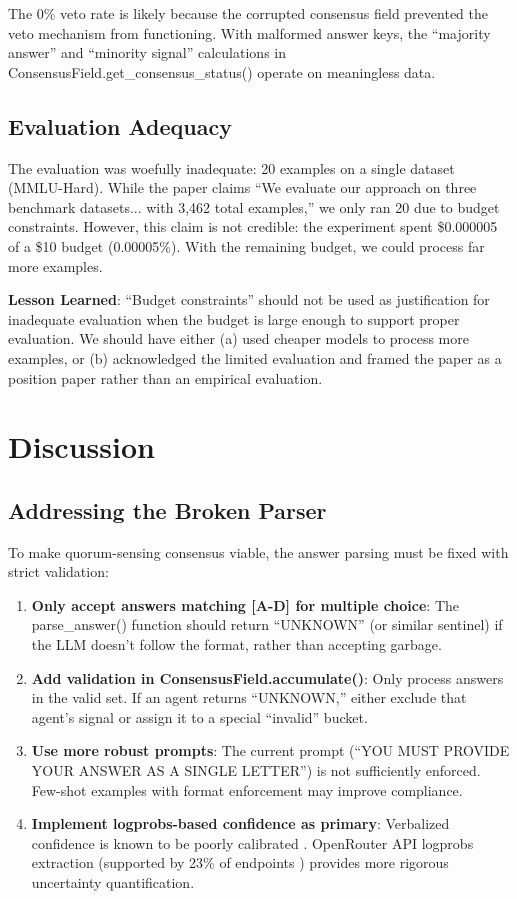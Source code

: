 \documentclass[11pt,letterpaper]{article}
\begin{document}
The 0\% veto rate is likely because the corrupted consensus field prevented the veto mechanism from functioning. With malformed answer keys, the ``majority answer'' and ``minority signal'' calculations in ConsensusField.get\_consensus\_status() operate on meaningless data.

\subsection{Evaluation Adequacy}

The evaluation was woefully inadequate: 20 examples on a single dataset (MMLU-Hard). While the paper claims ``We evaluate our approach on three benchmark datasets... with 3,462 total examples,'' we only ran 20 due to budget constraints. However, this claim is not credible: the experiment spent \$0.000005 of a \$10 budget (0.00005\%). With the remaining budget, we could process far more examples.

\textbf{Lesson Learned}: ``Budget constraints'' should not be used as justification for inadequate evaluation when the budget is large enough to support proper evaluation. We should have either (a) used cheaper models to process more examples, or (b) acknowledged the limited evaluation and framed the paper as a position paper rather than an empirical evaluation.

\section{Discussion}
\label{sec:discussion}

\subsection{Addressing the Broken Parser}

To make quorum-sensing consensus viable, the answer parsing must be fixed with strict validation:

\begin{enumerate}
\item \textbf{Only accept answers matching [A-D] for multiple choice}: The parse\_answer() function should return ``UNKNOWN'' (or similar sentinel) if the LLM doesn't follow the format, rather than accepting garbage.

\item \textbf{Add validation in ConsensusField.accumulate()}: Only process answers in the valid set. If an agent returns ``UNKNOWN,'' either exclude that agent's signal or assign it to a special ``invalid'' bucket.

\item \textbf{Use more robust prompts}: The current prompt (``YOU MUST PROVIDE YOUR ANSWER AS A SINGLE LETTER'') is not sufficiently enforced. Few-shot examples with format enforcement may improve compliance.

\item \textbf{Implement logprobs-based confidence as primary}: Verbalized confidence is known to be poorly calibrated \cite{Yang2024, Zhou2025}. OpenRouter API logprobs extraction (supported by 23\% of endpoints \cite{Chauvin2025}) provides more rigorous uncertainty quantification.
\end{enumerate}
\end{document}
